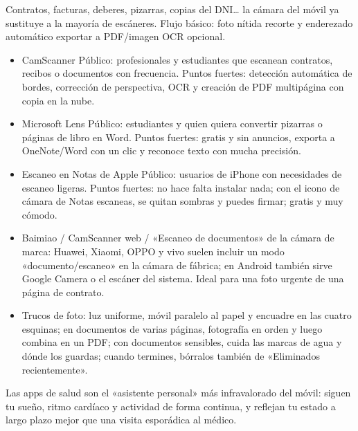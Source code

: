 
Contratos, facturas, deberes, pizarras, copias del DNI… la cámara del móvil ya sustituye a la mayoría de escáneres. Flujo básico: foto nítida recorte y enderezado automático exportar a PDF/imagen OCR opcional.

\begin{itemize}
  \item CamScanner Público: profesionales y estudiantes que escanean contratos, recibos o documentos con frecuencia. Puntos fuertes: detección automática de bordes, corrección de perspectiva, OCR y creación de PDF multipágina con copia en la nube.
  \item Microsoft Lens Público: estudiantes y quien quiera convertir pizarras o páginas de libro en Word. Puntos fuertes: gratis y sin anuncios, exporta a OneNote/Word con un clic y reconoce texto con mucha precisión.
  \item Escaneo en Notas de Apple Público: usuarios de iPhone con necesidades de escaneo ligeras. Puntos fuertes: no hace falta instalar nada; con el icono de cámara de Notas escaneas, se quitan sombras y puedes firmar; gratis y muy cómodo.
  \item Baimiao / CamScanner web / «Escaneo de documentos» de la cámara de marca: Huawei, Xiaomi, OPPO y vivo suelen incluir un modo «documento/escaneo» en la cámara de fábrica; en Android también sirve Google Camera o el escáner del sistema. Ideal para una foto urgente de una página de contrato.
  \item Trucos de foto: luz uniforme, móvil paralelo al papel y encuadre en las cuatro esquinas; en documentos de varias páginas, fotografía en orden y luego combina en un PDF; con documentos sensibles, cuida las marcas de agua y dónde los guardas; cuando termines, bórralos también de «Eliminados recientemente».
\end{itemize}


Las apps de salud son el «asistente personal» más infravalorado del móvil: siguen tu sueño, ritmo cardíaco y actividad de forma continua, y reflejan tu estado a largo plazo mejor que una visita esporádica al médico.


